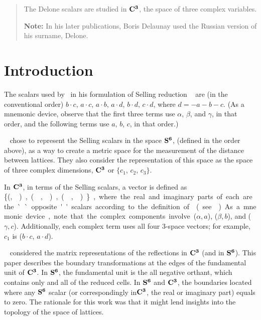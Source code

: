 \documentclass[preprint]{iucr}              %
\numberwithin{equation}{section}
\newcommand{\SVI}[0]{$\bf{S^{6}}$}
\newcommand{\CIII}[0]{$\bf{C^{3}}$}
\begin{document}
	\newcommand{\ci}[0]{$c_1$}
	\newcommand{\cii}[0]{$c_2$}
	\newcommand{\ciii}[0]{$c_3$}
	
	
	\begin{abstract}
		
		The Delone scalars are studied in \CIII, the space of three complex variables.
		
		{\bf Note:}  In his later publications, Boris Delaunay used the Russian version of his surname, Delone.\\
		
		
	\end{abstract}
	
	
	\section{Introduction}
	
	The scalars used by~ in his formulation of Selling reduction ~\cite{Selling1874}
	are (in the conventional order) $b \cdot c$, $a \cdot c$, $a \cdot b$, $a \cdot d$, 
	$b \cdot d$, $c \cdot d$, where $d = -a-b-c$. 
	(As a mnemonic device, 
	observe that the first three terms use
	$\alpha$, $\beta$, and $\gamma$, 
	in that order, 
	and the following terms use $a$, $b$, $c$, in that order.)
	
	~ chose to 
	represent the Selling scalars in the space \SVI{},
	\Svec{} (defined in the order above), 
	as a way to create a metric space
	for the measurement of the distance between lattices. 
	They also consider the representation of this space as the
	space of three complex dimensions, \CIII{} or 
	{$\{c_1$}, {$c_2$}, {$c_3\}$}. 	
	
	In \CIII{}, in terms of the Selling scalars, 
	a vector is defined as \{(\si,\siv ), (\sii,\sv),(\siii,\svi)\}, 
	where the real and imaginary parts
	of each are the ``opposite'' scalars 
	according to the definition of~ (see~).
	As a mnemonic device, 
	note that the complex components involve ($\alpha,a$), ($\beta, b$), and ($\gamma,c$).
	Additionally, each complex term uses all 
	four 3-space vectors; for example, $c_1$ is ($b \cdot c$, $a \cdot d$).
	
	~ considered the matrix representations 
	of the reflections in \CIII{} (and in \SVI{}). 
	This paper describes the boundary transformations 
	at the edges of the fundamental	unit of \CIII{}. 
	In \SVI{}, the fundamental unit is the all negative orthant, 
	which contains only and	all of the reduced cells. 
	In \SVI{} and \CIII{}, 
	the boundaries located where any \SVI{} scalar 
	(or correspondingly in\CIII{}, the real or imaginary part) 
	equals to zero. The rationale for this work was 
	that it might lend insights into the topology of
	the space of lattices. 
	
\end{document}
